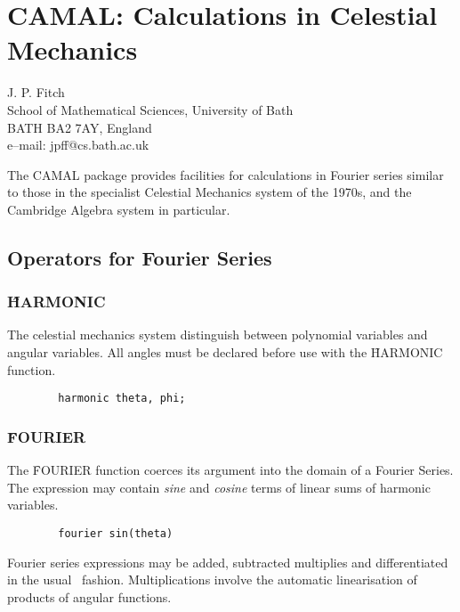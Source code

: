 \chapter[CAMAL: Celestial Mechanics]{CAMAL: Calculations in Celestial Mechanics} 
\label{CAMAL}

{\footnotesize
\begin{center}
J. P. Fitch \\
School of Mathematical Sciences, University of Bath\\
BATH BA2 7AY, England \\[0.05in]
e--mail: jpff@cs.bath.ac.uk
\end{center}
}

The CAMAL package provides facilities for calculations in Fourier
series similar to those in the specialist Celestial Mechanics system
of the 1970s, and the Cambridge Algebra system in
particular. 

\section{Operators for Fourier Series}

\subsection*{\f{HARMONIC}}

The celestial mechanics system distinguish between polynomial
variables and angular variables.  All angles must be declared before
use with the \f{HARMONIC} function. 
\begin{verbatim}
        harmonic theta, phi;
\end{verbatim}


\subsection*{\f{FOURIER}}

The \f{FOURIER} function coerces its argument into the domain of a
Fourier Series.   The expression may contain {\em sine} and {\em
cosine} terms of linear sums of harmonic variables.
\begin{verbatim}
        fourier sin(theta)
\end{verbatim}

Fourier series expressions may be added, subtracted multiplies and
differentiated in the usual \REDUCE\ fashion.  Multiplications involve
the automatic linearisation of products of angular functions.

